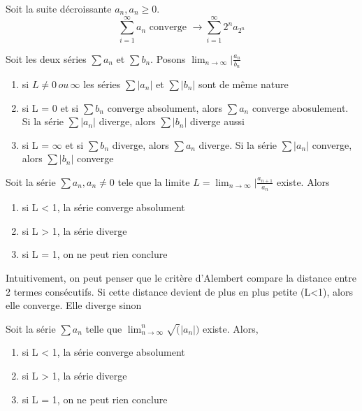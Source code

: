 \documentclass{article}
\begin{document}
\begin{theorem}
    Soit la suite décroissante ${a_n}, a_n \geq 0$.
    $$ \sum^{\infty}_{i=1} a_n \text{ converge } \longrightarrow
    \sum^{\infty}_{i=1} 2^n a_{2^n} $$
\end{theorem}

\begin{theorem}
    Soit les deux séries $ \sum a_n$ et $ \sum b_n$. Posons
    $ \lim_{n \to \infty} |\frac{a_n}{b_n} $
    \begin{enumerate}
        \item si $L \neq 0 \, ou \, \infty$ les séries $ \sum |a_n|$ et
	    $ \sum |b_n|$ sont de même nature
	\item si L = 0 et si $ \sum b_n$ converge absolument, alors
	    $ \sum a_n $ converge abosulement. Si la série $ \sum |a_n|$
	    diverge, alors $ \sum |b_n|$ diverge aussi
	\item si L = $\infty$ et si $ \sum b_n$ diverge, alors
	    $ \sum a_n $ diverge. Si la série $ \sum |a_n|$
	    converge, alors $ \sum |b_n|$ converge
    \end{enumerate}
\end{theorem}

\begin{theorem}
    Soit la série $ \sum a_n , a_n \neq 0 $ tele que la limite
    $ L = \lim_{n \to \infty} | \frac{a_{n+1}}{a_n} $ existe. Alors
    \begin{enumerate}
        \item si L < 1, la série converge absolument
	\item si L > 1, la série diverge
	\item si L = 1, on ne peut rien conclure
    \end{enumerate}
\end{theorem}

\begin{intuition}
    Intuitivement, on peut penser que le critère d'Alembert compare
    la distance entre 2 termes consécutifs. Si cette distance devient
    de plus en plus petite (L<1), alors elle converge. Elle diverge sinon
\end{intuition}

\begin{theorem}
    Soit la série $\sum a_n$ telle que
    $ \lim_{n \to \infty} ^n\sqrt(|a_n|)$ existe. Alors,
    \begin{enumerate}
        \item si L < 1, la série converge absolument
	\item si L > 1, la série diverge
	\item si L = 1, on ne peut rien conclure
    \end{enumerate}
\end{theorem}
\end{document}
